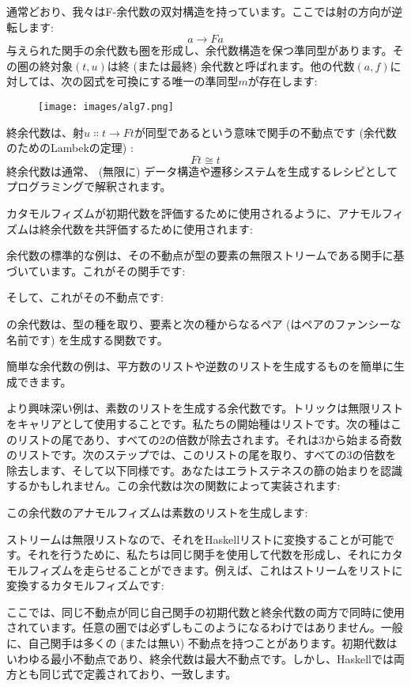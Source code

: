 通常どおり、我々はF-余代数の双対構造を持っています。ここでは射の方向が逆転します: 
\[a \to F a\]
与えられた関手の余代数も圏を形成し、余代数構造を保つ準同型があります。その圏の終対象$(t, u)$は終 (または最終) 余代数と呼ばれます。他の代数$(a, f)$に対しては、次の図式を可換にする唯一の準同型$m$が存在します: 

\begin{figure}[H]
  \centering
  \texttt{[image: images/alg7.png]}
\end{figure}

\noindent
終余代数は、射$u \Colon t \to F t$が同型であるという意味で関手の不動点です (余代数のためのLambekの定理) : 
\[F t \cong t\]
終余代数は通常、 (無限に) データ構造や遷移システムを生成するレシピとしてプログラミングで解釈されます。

カタモルフィズムが初期代数を評価するために使用されるように、アナモルフィズムは終余代数を共評価するために使用されます: 

余代数の標準的な例は、その不動点が型の要素の無限ストリームである関手に基づいています。これがその関手です: 

そして、これがその不動点です: 

の余代数は、型の種を取り、要素と次の種からなるペア (はペアのファンシーな名前です) を生成する関数です。

簡単な余代数の例は、平方数のリストや逆数のリストを生成するものを簡単に生成できます。

より興味深い例は、素数のリストを生成する余代数です。トリックは無限リストをキャリアとして使用することです。私たちの開始種はリスト\code{{[}2..{]}}です。次の種はこのリストの尾であり、すべての2の倍数が除去されます。それは3から始まる奇数のリストです。次のステップでは、このリストの尾を取り、すべての3の倍数を除去します、そして以下同様です。あなたはエラトステネスの篩の始まりを認識するかもしれません。この余代数は次の関数によって実装されます: 

この余代数のアナモルフィズムは素数のリストを生成します: 

ストリームは無限リストなので、それをHaskellリストに変換することが可能です。それを行うために、私たちは同じ関手を使用して代数を形成し、それにカタモルフィズムを走らせることができます。例えば、これはストリームをリストに変換するカタモルフィズムです: 

ここでは、同じ不動点が同じ自己関手の初期代数と終余代数の両方で同時に使用されています。任意の圏では必ずしもこのようになるわけではありません。一般に、自己関手は多くの (または無い) 不動点を持つことがあります。初期代数はいわゆる最小不動点であり、終余代数は最大不動点です。しかし、Haskellでは両方とも同じ式で定義されており、一致します。

